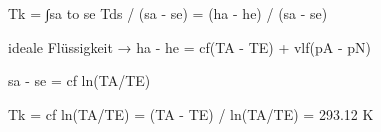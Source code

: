 Tk = ∫sa to se Tds / (sa - se) = (ha - he) / (sa - se)

ideale Flüssigkeit → ha - he = cf(TA - TE) + vlf(pA - pN)

sa - se = cf ln(TA/TE)

Tk = cf ln(TA/TE) = (TA - TE) / ln(TA/TE) = 293.12 K